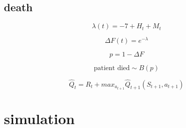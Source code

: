 \documentclass[12pt]{article}
\begin{document}

\subsection{death} %
\label{sub:death}

\[
\lambda(t) = -7 + H_{t} + M_{t}
\]

\[
\Delta F(t) = e^{-\lambda}
\]

\[
p = 1 - \Delta F
\]

\[
\text{patient died} \sim B(p)
\]



\[
\hat{Q}_{t} = R_{t} + max_{a_{t + 1}} \hat{Q}_{t+1}(S_{t+1}, a_{t+1})
\]

\section{simulation} %
\label{sec:simulation}



\end{document}
